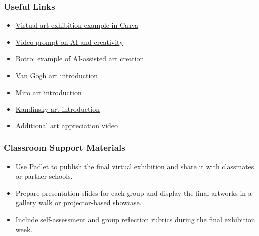 \documentclass[11pt, a4paper]{article}
\begin{document}
\subsubsection*{Useful Links}
\begin{itemize}
    \item \href{https://www.canva.com/design/DAGp4QA1HZU/XiZdrWwJxfQ0qGWq2-MY-g/view?utm_content=DAGp4QA1HZU&utm_campaign=designshare&utm_medium=link2&utm_source=uniquelinks&utlId=h115aaa5c68}{Virtual art exhibition example in Canva}
    \item \href{https://www.youtube.com/watch?v=ttIOdAdQaUE}{Video prompt on AI and creativity}
    \item \href{https://botto.com/}{Botto: example of AI-assisted art creation}
    \item \href{https://www.youtube.com/watch?v=5gTV9-vPeEU}{Van Gogh art introduction}
    \item \href{https://www.youtube.com/watch?v=DLsJc_4AGa4}{Miro art introduction}
    \item \href{https://www.youtube.com/watch?v=CMvzPTyLbMA}{Kandinsky art introduction}
    \item \href{https://www.youtube.com/watch?v=ZCMjzcvOy8w}{Additional art appreciation video}
\end{itemize}

\subsubsection*{Classroom Support Materials}
\begin{itemize}
    \item Use Padlet to publish the final virtual exhibition and share it with classmates or partner schools.
    \item Prepare presentation slides for each group and display the final artworks in a gallery walk or projector-based showcase.
    \item Include self-assessment and group reflection rubrics during the final exhibition week.
\end{itemize}

\end{document}
